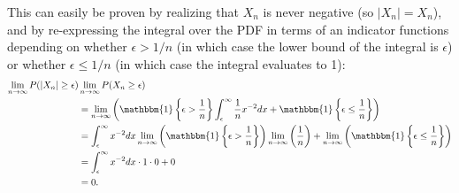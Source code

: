 \begin{problem}{14}  This can easily be proven by realizing that $X_n$ is never negative (so $|X_n|=X_n$), and by re-expressing the integral over the PDF in terms of an indicator functions depending on whether $\epsilon>1/n$ (in which case the lower bound of the integral is $\epsilon$) or whether $\epsilon \le 1/n$ (in which case the integral evaluates to 1):
\begin{align*}
\lim_{n \rightarrow \infty} P(|X_n|\ge \epsilon) &\lim_{n \rightarrow \infty} P(X_n\ge \epsilon)\\
& =\lim_{n \rightarrow \infty} \left( \mathbbm{1}\left\{\epsilon > \frac{1}{n} \right\} \int_{\epsilon}^\infty \frac{1}{n}x^{-2}dx + \mathbbm{1} \left\{\epsilon \le \frac{1}{n} \right\} \right) \\
& =\int_{\epsilon}^\infty x^{-2}dx\lim_{n \rightarrow \infty}\left( \mathbbm{1}\left\{\epsilon > \frac{1}{n} \right\} \right) \lim_{n \rightarrow \infty}\left( \frac{1}{n} \right) +\lim_{n \rightarrow \infty} \left( \mathbbm{1} \left\{\epsilon \le \frac{1}{n} \right\} \right) \\
& = \int_{\epsilon}^\infty x^{-2}dx\cdot 1\cdot 0 + 0 \\
&=0.
\end{align*}

\end{problem}


